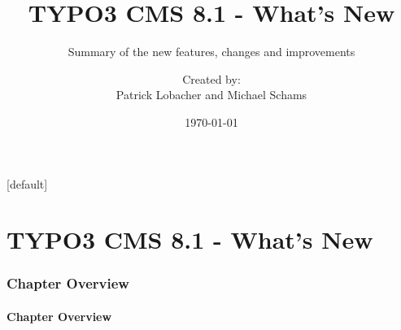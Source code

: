 \documentclass[t]{beamer}
\title{TYPO3 CMS 8.1 - What's New}
\subtitle{Summary of the new features, changes and improvements}
\author{
	\centerline{Created by:}
	\centerline{Patrick Lobacher and Michael Schams}
}
\date{\today}
\begin{document}
\sharefont


\begingroup
	[default]
	\begin{frame}
		\titlepage
	\end{frame}
\endgroup


\section*{TYPO3 CMS 8.1 - What's New}
\begin{frame}[fragile]
	\frametitle{Chapter Overview}
	\framesubtitle{Chapter Overview}

	\tableofcontents

\end{frame}










\end{document}
